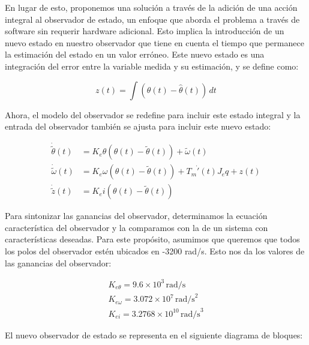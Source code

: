 \documentclass{article}
\begin{document}
En lugar de esto, proponemos una solución a través de la adición de una acción integral al 
observador de estado, un enfoque que aborda el problema a través de software sin requerir hardware 
adicional. Esto implica la introducción de un nuevo estado en nuestro observador que tiene en 
cuenta el tiempo que permanece la estimación del estado en un valor erróneo. Este nuevo estado es 
una integración del error entre la variable medida y su estimación, y se define como:

\begin{equation}
    z(t) = \int (\theta(t) - \hat{\theta}(t))\,dt
\end{equation}

Ahora, el modelo del observador se redefine para incluir este estado integral y la entrada del 
observador también se ajusta para incluir este nuevo estado:

\begin{align*}
    \dot{\tilde{\theta}}(t) &= K_e \theta \left(\theta(t) - \tilde{\theta}(t)\right) + \tilde{\omega}(t) \\
    \dot{\tilde{\omega}}(t) &= K_e \omega \left(\theta(t) - \tilde{\theta}(t)\right) + T_m \dot{'}(t) J_eq + z(t) \\
    \dot{\tilde{z}}(t) &= K_e i \left(\theta(t) - \tilde{\theta}(t)\right)
\end{align*}

Para sintonizar las ganancias del observador, determinamos la ecuación característica del 
observador y la comparamos con la de un sistema con características deseadas. Para este propósito, 
asumimos que queremos que todos los polos del observador estén ubicados en -3200 rad/s. Esto nos 
da los valores de las ganancias del observador:

\begin{align*}
    K_{e\theta} = 9.6 \times 10^3 \, \text{rad/s}\\
    K_{e\omega} = 3.072 \times 10^7 \, \text{rad/s}^2\\
    K_{ei} = 3.2768 \times 10^{10} \, \text{rad/s}^3
\end{align*}

El nuevo observador de estado se representa en el siguiente diagrama de bloques:
\end{document}

